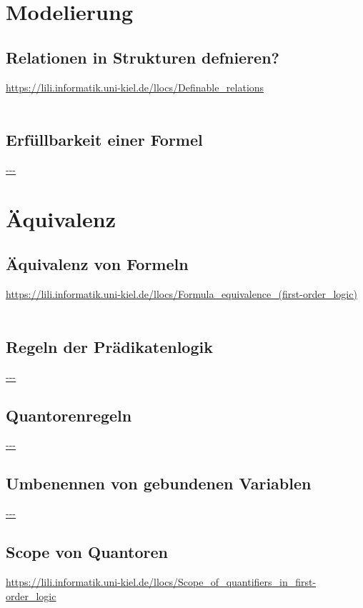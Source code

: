 \documentclass[twocolumn]{article}
\begin{document}
    \section{Modelierung}

    \subsection{Relationen in Strukturen defnieren?}
    \url{https://lili.informatik.uni-kiel.de/llocs/Definable_relations}\\\\

    \subsection{Erfüllbarkeit einer Formel}
    \url{---}\\

    \section{Äquivalenz}

    \subsection{Äquivalenz von Formeln}
    \url{https://lili.informatik.uni-kiel.de/llocs/Formula_equivalence_(first-order_logic)}\\\\

    \subsection{Regeln der Prädikatenlogik}
    \url{---}\\

    \subsection{Quantorenregeln}
    \url{---}\\

    \subsection{Umbenennen von gebundenen Variablen}
    \url{---}\\

    \subsection{Scope von Quantoren}
    \url{https://lili.informatik.uni-kiel.de/llocs/Scope_of_quantifiers_in_first-order_logic}\\\\
\end{document}
